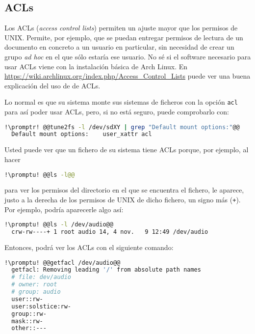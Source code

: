 \subsection{ACLs}
Los ACLs (\foreignlanguage{english}{\textit{access control lists}}) permiten un ajuste mayor que los permisos de
UNIX. Permite, por ejemplo, que se puedan entregar permisos de lectura de un documento en concreto a un usuario
en particular, sin necesidad de crear un grupo \textit{ad hoc} en el que sólo estaría ese usuario. No sé si el
software necesario para usar ACLs viene con la instalación básica de Arch Linux. En
\url{https://wiki.archlinux.org/index.php/Access_Control_Lists} puede ver una buena explicación del uso de de
ACLs.

Lo normal es que su sistema monte sus sistemas de ficheros con la opción \lstinline!acl! para así poder usar
ACLs, pero, si no está seguro, puede comprobarlo con:

\begin{lstlisting}[gobble=2,language=bash,style=bashinteract,escapechar=!]
  !\promptr! @@tune2fs -l /dev/sdXY | grep "Default mount options:"@@
  Default mount options:    user_xattr acl
\end{lstlisting}

Usted puede ver que un fichero de su sistema tiene ACLs porque, por ejemplo, al hacer

\begin{lstlisting}[gobble=2,language=bash,style=bashinteract,escapechar=!]
  !\promptu! @@ls -l@@
\end{lstlisting}

\noindent para ver los permisos del directorio en el que se encuentra el fichero, le aparece, justo a la derecha
de los permisos de UNIX de dicho fichero, un signo más (\lstinline!+!). Por ejemplo, podría aparecerle algo así:

\begin{lstlisting}[gobble=2,language=bash,style=bashinteract,escapechar=!]
  !\promptu! @@ls -l /dev/audio@@
  crw-rw----+ 1 root audio 14, 4 nov.   9 12:49 /dev/audio
\end{lstlisting}

\noindent Entonces, podrá ver los ACLs con el siguiente comando:

\begin{lstlisting}[gobble=2,language=bash,style=bashinteract,escapechar=!]
  !\promptu! @@getfacl /dev/audio@@
  getfacl: Removing leading '/' from absolute path names
  # file: dev/audio
  # owner: root
  # group: audio
  user::rw-
  user:solstice:rw-
  group::rw-
  mask::rw-
  other::---
\end{lstlisting}

